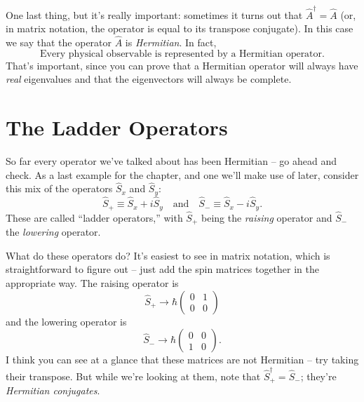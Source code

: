 One last thing, but it's really important:  sometimes it turns out that $\hat{A}^\dagger = \hat{A}$ (or, in matrix notation, the operator is equal to its transpose conjugate).  In this case we say that the operator $\hat{A}$ is \emph{Hermitian}.  In fact,
\[
\boxed{\text{Every physical observable is represented by a Hermitian operator.}}
\]
That's important, since you can prove that a Hermitian operator will always have \emph{real} eigenvalues and that the eigenvectors will always be complete.

\section{The Ladder Operators}

So far every operator we've talked about has been Hermitian -- go ahead and check.  As a last example for the chapter, and one we'll make use of later, consider this mix of the operators $\hat{S}_x$ and $\hat{S}_y$:
\begin{equation}
\hat{S}_+ \equiv \hat{S}_x + i\hat{S}_y \quad \text{and} \quad \hat{S}_- \equiv \hat{S}_x - i\hat{S}_y.
\end{equation}
These are called ``ladder operators,'' with $\hat{S}_+$ being the \emph{raising} operator and $\hat{S}_-$ the \emph{lowering} operator.

What do these operators do?  It's easiest to see in matrix notation, which is straightforward to figure out -- just add the spin matrices together in the appropriate way.  The raising operator is
\begin{equation}
\hat{S}_+ \to \hbar \begin{pmatrix} 0 & 1 \\ 0 & 0 \end{pmatrix}
\end{equation}
and the lowering operator is
\begin{equation}
\hat{S}_- \to \hbar \begin{pmatrix} 0 & 0 \\ 1 & 0 \end{pmatrix}.
\end{equation}
I think you can see at a glance that these matrices are not Hermitian -- try taking their transpose.  But while we're looking at them, note that $\hat{S}_+^\dagger = \hat{S}_-$; they're \emph{Hermitian conjugates}.

